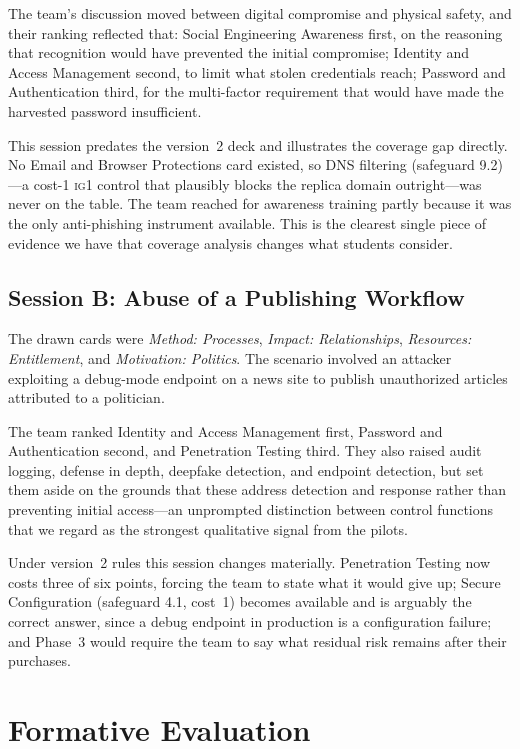 \documentclass[10pt,twocolumn,letterpaper]{article}
\newcommand{\ig}[1]{\textsc{ig#1}}
\begin{document}
The team's discussion moved between digital compromise and physical safety, and
their ranking reflected that: Social Engineering Awareness first, on the
reasoning that recognition would have prevented the initial compromise;
Identity and Access Management second, to limit what stolen credentials reach;
Password and Authentication third, for the multi-factor requirement that would
have made the harvested password insufficient.

This session predates the version~2 deck and illustrates the coverage gap
directly. No Email and Browser Protections card existed, so DNS filtering
(safeguard 9.2)---a cost-1 \ig{1} control that plausibly blocks the replica
domain outright---was never on the table. The team reached for awareness
training partly because it was the only anti-phishing instrument available.
This is the clearest single piece of evidence we have that coverage analysis
changes what students consider.

\subsection{Session B: Abuse of a Publishing Workflow}

The drawn cards were \emph{Method: Processes}, \emph{Impact: Relationships},
\emph{Resources: Entitlement}, and \emph{Motivation: Politics}. The scenario
involved an attacker exploiting a debug-mode endpoint on a news site to publish
unauthorized articles attributed to a politician.

The team ranked Identity and Access Management first, Password and
Authentication second, and Penetration Testing third. They also raised audit
logging, defense in depth, deepfake detection, and endpoint detection, but set
them aside on the grounds that these address detection and response rather than
preventing initial access---an unprompted distinction between control functions
that we regard as the strongest qualitative signal from the pilots.

Under version~2 rules this session changes materially. Penetration Testing now
costs three of six points, forcing the team to state what it would give up;
Secure Configuration (safeguard 4.1, cost~1) becomes available and is arguably
the correct answer, since a debug endpoint in production is a configuration
failure; and Phase~3 would require the team to say what residual risk remains
after their purchases.

\section{Formative Evaluation}
\label{sec:eval}
\end{document}
